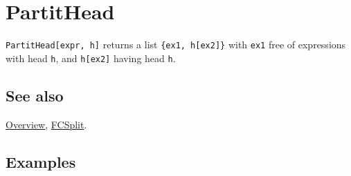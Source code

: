 \documentclass[../FeynCalcManual.tex]{subfiles}
\begin{document}
\hypertarget{partithead}{%
\section{PartitHead}\label{partithead}}

\texttt{PartitHead[\allowbreak{}expr,\ \allowbreak{}h]} returns a list
\texttt{\{\allowbreak{}ex1,\ \allowbreak{}h[\allowbreak{}ex2]\}} with
\texttt{ex1} free of expressions with head \texttt{h}, and
\texttt{h[\allowbreak{}ex2]} having head \texttt{h}.

\subsection{See also}

\hyperlink{toc}{Overview}, \hyperlink{fcsplit}{FCSplit}.

\subsection{Examples}
\end{document}
